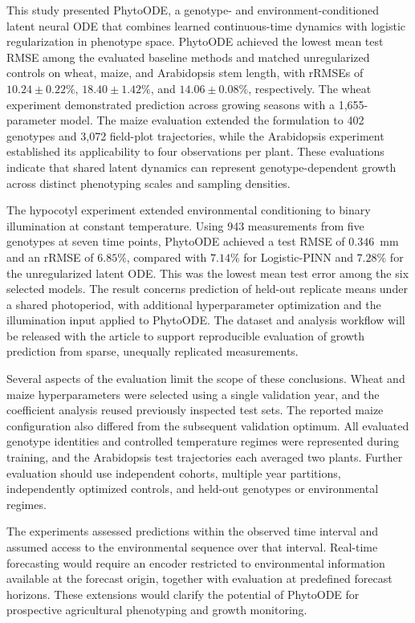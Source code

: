\documentclass[preprint,12pt,authoryear]{elsarticle}
\newcommand{\model}{PhytoODE}
\begin{document}
This study presented \model{}, a genotype- and environment-conditioned latent neural ODE that combines learned continuous-time dynamics with logistic regularization in phenotype space. PhytoODE achieved the lowest mean test RMSE among the evaluated baseline methods and matched unregularized controls on wheat, maize, and Arabidopsis stem length, with rRMSEs of $10.24\pm0.22\%$, $18.40\pm1.42\%$, and $14.06\pm0.08\%$, respectively. The wheat experiment demonstrated prediction across growing seasons with a 1,655-parameter model. The maize evaluation extended the formulation to 402 genotypes and 3,072 field-plot trajectories, while the Arabidopsis experiment established its applicability to four observations per plant. These evaluations indicate that shared latent dynamics can represent genotype-dependent growth across distinct phenotyping scales and sampling densities.

The hypocotyl experiment extended environmental conditioning to binary illumination at constant temperature. Using 943 measurements from five genotypes at seven time points, PhytoODE achieved a test RMSE of $0.346$~mm and an rRMSE of $6.85\%$, compared with $7.14\%$ for Logistic-PINN and $7.28\%$ for the unregularized latent ODE. This was the lowest mean test error among the six selected models. The result concerns prediction of held-out replicate means under a shared photoperiod, with additional hyperparameter optimization and the illumination input applied to PhytoODE. The dataset and analysis workflow will be released with the article to support reproducible evaluation of growth prediction from sparse, unequally replicated measurements.

Several aspects of the evaluation limit the scope of these conclusions. Wheat and maize hyperparameters were selected using a single validation year, and the coefficient analysis reused previously inspected test sets. The reported maize configuration also differed from the subsequent validation optimum. All evaluated genotype identities and controlled temperature regimes were represented during training, and the Arabidopsis test trajectories each averaged two plants. Further evaluation should use independent cohorts, multiple year partitions, independently optimized controls, and held-out genotypes or environmental regimes.

The experiments assessed predictions within the observed time interval and assumed access to the environmental sequence over that interval. Real-time forecasting would require an encoder restricted to environmental information available at the forecast origin, together with evaluation at predefined forecast horizons. These extensions would clarify the potential of PhytoODE for prospective agricultural phenotyping and growth monitoring.
\end{document}
